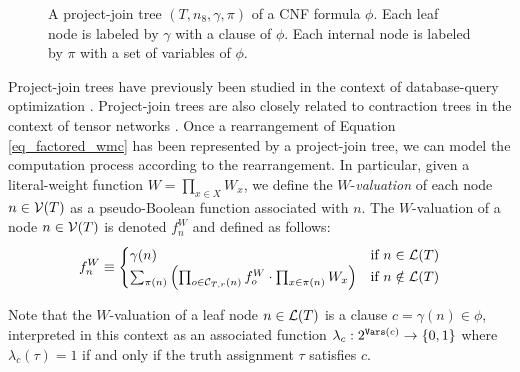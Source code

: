 \begin{figure}%
    \centering
\caption{
    A project-join tree $(T, n_{8}, \gamma, \pi)$ of a CNF formula $\phi$.
    Each leaf node is labeled by $\gamma$ with a clause of $\phi$.
    Each internal node is labeled by $\pi$ with a set of variables of $\phi$.
}
\label{fig_join_tree}
\end{figure}

Project-join trees have previously been studied in the context of database-query optimization \cite{MPPV04}.
Project-join trees are also closely related to contraction trees in the context of tensor networks \cite{EP14,DDV19}.
Once a rearrangement of Equation \eqref{eq_factored_wmc} has been represented by a project-join tree, we can model the computation process according to the rearrangement.
In particular, given a literal-weight function $W = \prod_{x \in X} W_x$, we define the $W$-\emph{valuation} of each node $n \in \mathcal{V}(T)$ as a pseudo-Boolean function associated with $n$.
The $W$-valuation of a node $n \in \mathcal{V}(T)$ is denoted $f^W_n$ and defined as follows:
\begin{equation}
\label{eq_valuation}
    f^W_n \equiv
    \begin{cases}
       \gamma(n) & \text{if}~n \in \mathcal{L}(T) \\
        \sum_{\pi(n)} \left(  \prod_{o \in \mathcal{C}_{T,r}(n)} f^W_o \cdot \prod_{x \in \pi(n)} W_x  \right) & \text{if}~n \notin \mathcal{L}(T)
    \end{cases}
\end{equation}

Note that the $W$-valuation of a leaf node $n \in \mathcal{L}(T)$ is a clause $c = \gamma(n) \in \phi$, interpreted in this context as an associated function $\lambda_c : 2^{\texttt{\upshape Vars}(c)} \to \left\{ 0, 1 \right\}$ where $\lambda_c(\tau) = 1$ if and only if the truth assignment $\tau$ satisfies $c$. 

